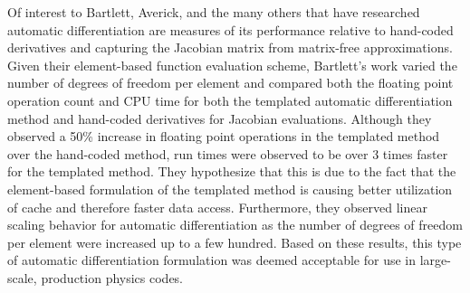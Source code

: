 Of interest to Bartlett, Averick, and the many others that have
researched automatic differentiation are measures of its performance
relative to hand-coded derivatives and capturing the Jacobian matrix
from matrix-free approximations. Given their element-based function
evaluation scheme, Bartlett's work varied the number of degrees of
freedom per element and compared both the floating point operation
count and CPU time for both the templated automatic differentiation
method and hand-coded derivatives for Jacobian evaluations. Although
they observed a 50\% increase in floating point operations in the
templated method over the hand-coded method, run times were observed
to be over 3 times faster for the templated method. They hypothesize
that this is due to the fact that the element-based formulation of the
templated method is causing better utilization of cache and therefore
faster data access. Furthermore, they observed linear scaling behavior
for automatic differentiation as the number of degrees of freedom per
element were increased up to a few hundred. Based on these results,
this type of automatic differentiation formulation was deemed
acceptable for use in large-scale, production physics codes.
